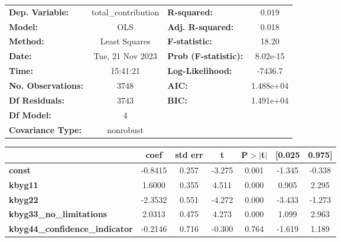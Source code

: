 \begin{center}
\begin{tabular}{lclc}
\toprule
\textbf{Dep. Variable:}                & total\_contribution & \textbf{  R-squared:         } &     0.019   \\
\textbf{Model:}                        &         OLS         & \textbf{  Adj. R-squared:    } &     0.018   \\
\textbf{Method:}                       &    Least Squares    & \textbf{  F-statistic:       } &     18.20   \\
\textbf{Date:}                         &   Tue, 21 Nov 2023  & \textbf{  Prob (F-statistic):} &  8.02e-15   \\
\textbf{Time:}                         &       15:41:21      & \textbf{  Log-Likelihood:    } &   -7436.7   \\
\textbf{No. Observations:}             &          3748       & \textbf{  AIC:               } & 1.488e+04   \\
\textbf{Df Residuals:}                 &          3743       & \textbf{  BIC:               } & 1.491e+04   \\
\textbf{Df Model:}                     &             4       & \textbf{                     } &             \\
\textbf{Covariance Type:}              &      nonrobust      & \textbf{                     } &             \\
\bottomrule
\end{tabular}
\begin{tabular}{lcccccc}
                                       & \textbf{coef} & \textbf{std err} & \textbf{t} & \textbf{P$> |$t$|$} & \textbf{[0.025} & \textbf{0.975]}  \\
\midrule
\textbf{const}                         &      -0.8415  &        0.257     &    -3.275  &         0.001        &       -1.345    &       -0.338     \\
\textbf{kbyg11}                        &       1.6000  &        0.355     &     4.511  &         0.000        &        0.905    &        2.295     \\
\textbf{kbyg22}                        &      -2.3532  &        0.551     &    -4.272  &         0.000        &       -3.433    &       -1.273     \\
\textbf{kbyg33\_no\_limitations}       &       2.0313  &        0.475     &     4.273  &         0.000        &        1.099    &        2.963     \\
\textbf{kbyg44\_confidence\_indicator} &      -0.2146  &        0.716     &    -0.300  &         0.764        &       -1.619    &        1.189     \\

\end{tabular}
\end{center}
